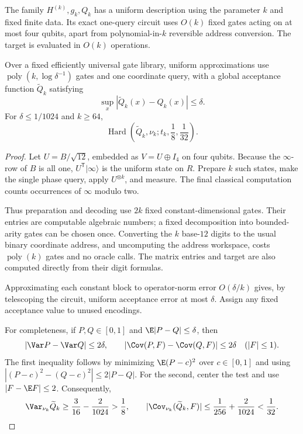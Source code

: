 \begin{corollary}
\label{ian:hadamard-efficient-uniform}
The family \(H^{(k)},g_k,Q_k\) has a uniform description using the parameter \(k\) and fixed finite data. Its exact one-query circuit uses \(O(k)\) fixed gates acting on at most four qubits, apart from polynomial-in-\(k\) reversible address conversion. The target is evaluated in \(O(k)\) operations.

Over a fixed efficiently universal gate library, uniform approximations use
\(\operatorname{poly}(k,\log\delta^{-1})\) gates and one coordinate query, with a global acceptance function \(\widetilde Q_k\) satisfying
\[
 \sup_x|\widetilde Q_k(x)-Q_k(x)|\le\delta.
\]
For \(\delta\le1/1024\) and \(k\ge64\),
\[
 \operatorname{Hard}\left(
 \widetilde Q_k,\nu_k;t_k,\frac18,\frac1{32}\right).
\]
\end{corollary}
\begin{proof}
Let \(U=B/\sqrt{12}\), embedded as \(V=U\oplus I_4\) on four qubits.
Because the \(\infty\)-row of \(B\) is all one,
\(U^{\mathsf T}|\infty\rangle\) is the uniform state on \(R\).
Prepare \(k\) such states, make the single phase query, apply \(U^{\otimes k}\), and measure. The final classical computation counts occurrences of \(\infty\) modulo two.

Thus preparation and decoding use \(2k\) fixed constant-dimensional gates.
Their entries are computable algebraic numbers; a fixed decomposition into bounded-arity gates can be chosen once. Converting the \(k\) base-\(12\) digits to the usual binary coordinate address, and uncomputing the address workspace, costs \(\operatorname{poly}(k)\) gates and no oracle calls. The matrix entries and target are also computed directly from their digit formulas.

Approximating each constant block to operator-norm error
\(O(\delta/k)\) gives, by telescoping the circuit, uniform acceptance error at most \(\delta\). Assign any fixed acceptance value to unused encodings.

For completeness, if \(P,Q\in[0,1]\) and \(\E|P-Q|\le\delta\), then
\[
 |\Var P-\Var Q|\le2\delta,
 \qquad
 |\Cov(P,F)-\Cov(Q,F)|\le2\delta
 \quad(|F|\le1).
\]
The first inequality follows by minimizing \(\E(P-c)^2\) over
\(c\in[0,1]\) and using
\(|(P-c)^2-(Q-c)^2|\le2|P-Q|\).
For the second, center the test and use \(|F-\E F|\le2\).
Consequently,
\[
 \Var_{\nu_k}\widetilde Q_k
 \ge\frac3{16}-\frac2{1024}>\frac18,
 \qquad
 |\Cov_{\nu_k}(\widetilde Q_k,F)|
 \le\frac1{256}+\frac2{1024}<\frac1{32}.
\]
\end{proof}


